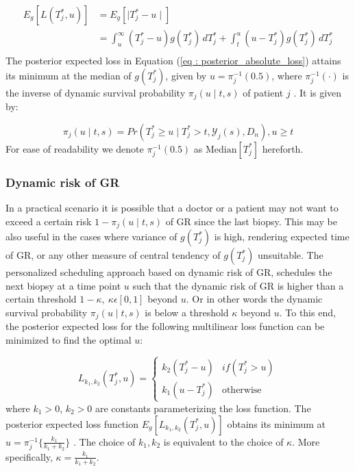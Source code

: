 \begin{equation}
\label{eq : posterior_absolute_loss}
\begin{split}
E_g[L(T^*_j, u)] &= E_g[\mid T^*_j - u \mid]\\
&= \int_u^\infty (T^*_j - u) g(T^*_j)\, dT^*_j + \int_t^u (u - T^*_j) g(T^*_j)\, dT^*_j\\
\end{split}
\end{equation}
The posterior expected loss in Equation (\ref{eq : posterior_absolute_loss}) attains its minimum at the median of $g(T^*_j)$, given by $u = \pi_j^{-1}(0.5)$, where $\pi_j^{-1}(\cdot)$ is the inverse of dynamic survival probability $\pi_j(u \mid t, s)$ of patient $j$ \citep{rizopoulos2011dynamic}. It is given by:

\begin{equation}
\pi_j(u \mid t, s) = Pr(T^*_j \geq u \mid  T^*_j >t, \mathcal{Y}_j(s), D_n), u \geq t
\end{equation}
For ease of readability we denote $\pi_j^{-1}(0.5)$ as $\text{Median}[T^*_j]$ hereforth.

\subsubsection{Dynamic risk of GR}
\label{subsubsec : dynamic_risk_definitions}
In a practical scenario it is possible that a doctor or a patient may not want to exceed a certain risk $1 - \pi_j(u \mid t, s)$ of GR since the last biopsy. This may be also useful in the cases where variance of $g(T^*_j)$ is high, rendering expected time of GR, or any other measure of central tendency of $g(T^*_j)$ unsuitable. The personalized scheduling approach based on dynamic risk of GR, schedules the next biopsy at a time point $u$ such that the dynamic risk of GR is higher than a certain threshold $1-\kappa,\ \kappa \epsilon [0,1]$ beyond $u$. Or in other words the dynamic survival probability $\pi_j(u \mid t, s)$ is below a threshold $\kappa$ beyond $u$. To this end, the posterior expected loss for the following multilinear loss function can be minimized to find the optimal $u$:

\begin{equation}
\label{eq : loss_dynamic_risk}
L_{k_1, k_2}(T^*_j, u) =
    \begin{cases}
      k_2(T^*_j-u) & if(T^*_j > u)\\
      k_1(u-T^*_j) & \text{otherwise}
    \end{cases}       
\end{equation}
where $k_1 > 0$, $k_2 > 0$ are constants parameterizing the loss function. The posterior expected loss function $E_g[L_{k_1, k_2}(T^*_j, u)]$ obtains its minimum at $u = \pi_j^{-1}\Big\{\frac{k_1}{k_1 + k_2}\Big\}$ \citep{robertBayesianChoice}. The choice of $k_1, k_2$ is equivalent to the choice of $\kappa$. More specifically, $\kappa = \frac{k_1}{k_1 + k_2}$.

